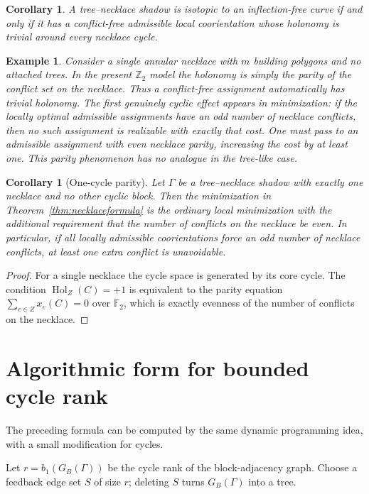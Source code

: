 \documentclass[11pt]{article}
\newtheorem{corollary}[theorem]{Corollary}
\newtheorem{example}[theorem]{Example}
\newcommand{\Hol}{\operatorname{Hol}}
\newcommand{\Ftwo}{\mathbb F_2}
\begin{document}
\begin{corollary}\label{cor:necklacezero}
A tree--necklace shadow is isotopic to an inflection-free curve if and only if it has a conflict-free admissible local coorientation whose holonomy is trivial around every necklace cycle.
\end{corollary}

\begin{example}
Consider a single annular necklace with $m$ building polygons and no attached trees.  In the present $\mathbb Z_2$ model the holonomy is simply the parity of the conflict set on the necklace.  Thus a conflict-free assignment automatically has trivial holonomy.  The first genuinely cyclic effect appears in minimization: if the locally optimal admissible assignments have an odd number of necklace conflicts, then no such assignment is realizable with exactly that cost.  One must pass to an admissible assignment with even necklace parity, increasing the cost by at least one.  This parity phenomenon has no analogue in the tree-like case.
\end{example}

\begin{corollary}[One-cycle parity]
\label{cor:onecycle}
Let $\Gamma$ be a tree--necklace shadow with exactly one necklace and no other cyclic block.  Then the minimization in Theorem~\ref{thm:necklaceformula} is the ordinary local minimization with the additional requirement that the number of conflicts on the necklace be even.  In particular, if all locally admissible coorientations force an odd number of necklace conflicts, at least one extra conflict is unavoidable.
\end{corollary}

\begin{proof}
For a single necklace the cycle space is generated by its core cycle.  The condition $\Hol_Z(C)=+1$ is equivalent to the parity equation $\sum_{e\in Z}x_e(C)=0$ over $\Ftwo$, which is exactly evenness of the number of conflicts on the necklace.
\end{proof}

\section{Algorithmic form for bounded cycle rank}

The preceding formula can be computed by the same dynamic programming idea, with a small modification for cycles.

Let $r=b_1(G_B(\Gamma))$ be the cycle rank of the block-adjacency graph.  Choose a feedback edge set $S$ of size $r$; deleting $S$ turns $G_B(\Gamma)$ into a tree.
\end{document}
